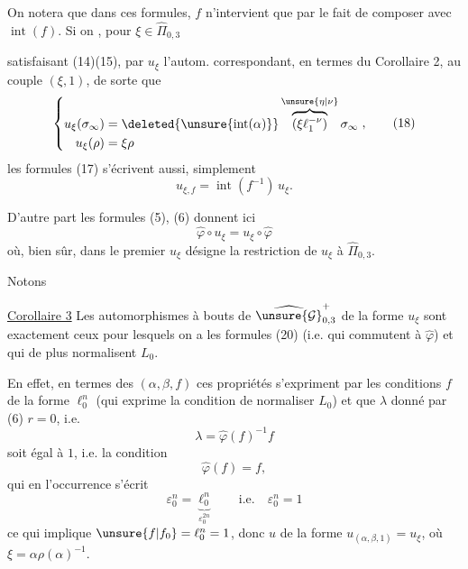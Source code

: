 On notera que dans ces formules, $f$ n'intervient que par le fait de
composer avec $\operatorname{int}(f)$. Si on
, pour $\xi\in\widehat\Pi_{0,3}$


satisfaisant (14)(15), par $u_\xi$ l'autom.
 correspondant, en termes du
Corollaire 2, au couple $(\xi,1)$, de sorte que
\[
\left\{\begin{aligned}
u_\xi(\sigma_\infty)
 &=\deleted{\unsure{\operatorname{int}(\alpha)}}
 \overbrace{(\xi\ell_1^{-\nu})}^{\unsure{\eta|\nu}}\sigma_\infty\\
u_\xi(\rho)&=\xi\rho
\end{aligned}\right.,
\tag{18}
\]
les formules (17) s'écrivent aussi, simplement
\[
u_{\xi,f}=\operatorname{int}(f^{-1})\,u_\xi.
\tag{19}
\]

D'autre part les formules (5), (6) donnent ici
\[
\widehat\varphi\circ u_\xi=u_\xi\circ\widehat\varphi
\tag{20}
\]
où, bien sûr, dans le premier  $u_\xi$ désigne la
restriction de $u_\xi$ à $\widehat\Pi_{0,3}$.

Notons

\uline{Corollaire 3} Les automorphismes à bouts de
$\widehat{\unsure{\mathcal G}}_{0,3}^{+}$ de la forme $u_\xi$
 sont exactement ceux pour
lesquels on a les  formules (20) (i.e. qui
 commutent à $\widehat\varphi$) et qui de plus
normalisent $L_0$.


En effet, en termes des  $(\alpha,\beta,f)$  ces propriétés s'expriment par les conditions   $f$ de la forme $\ell_0^n$ (qui exprime la condition de normaliser $L_0$) et que $\lambda$ donné par (6) \uline{} $r=0$, i.e.
\[
\lambda=\widehat\varphi(f)^{-1}f
\tag{21}
\]
soit égal à $1$, i.e. la condition
\[
\widehat\varphi(f)=f,
\tag{22}
\]
qui en l'occurrence s'écrit
\[
\varepsilon_0^n=\underbrace{\ell_0^n}_{\varepsilon_0^{2n}}
\qquad\text{i.e.}\quad \varepsilon_0^n=1
\]
ce qui implique $\unsure{f|f_0}=\ell_0^n=1$, donc $u$ de la forme $u_{(\alpha,\beta,1)}=u_\xi$, où $\xi=\alpha\rho(\alpha)^{-1}$.

